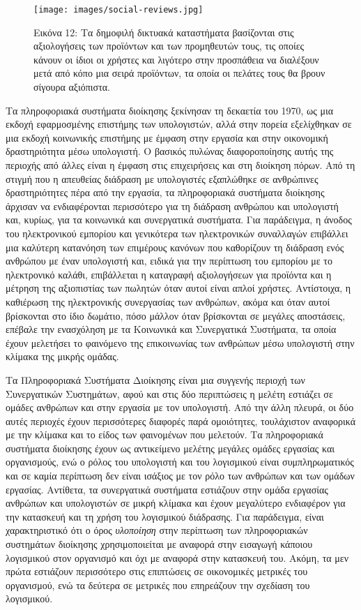 \documentclass[
]{article}
\begin{document}
\leavevmode{}%
\begin{figure}
\hypertarget{fig:social-reviews}{%
\centering
\texttt{[image: images/social-reviews.jpg]}
\caption{Εικόνα 12: Τα δημοφιλή δικτυακά καταστήματα βασίζονται στις
αξιολογήσεις των προϊόντων και των προμηθευτών τους, τις οποίες κάνουν
οι ίδιοι οι χρήστες και λιγότερο στην προσπάθεια να διαλέξουν μετά από
κόπο μια σειρά προϊόντων, τα οποία οι πελάτες τους θα βρουν σίγουρα
αξιόπιστα.}\label{fig:social-reviews}
}
\end{figure}

Τα πληροφοριακά συστήματα διοίκησης ξεκίνησαν τη δεκαετία του 1970, ως
μια εκδοχή εφαρμοσμένης επιστήμης των υπολογιστών, αλλά στην πορεία
εξελίχθηκαν σε μια εκδοχή κοινωνικής επιστήμης με έμφαση στην εργασία
και στην οικονομική δραστηριότητα μέσω υπολογιστή. Ο βασικός πυλώνας
διαφοροποίησης αυτής της περιοχής από άλλες είναι η έμφαση στις
επιχειρήσεις και στη διοίκηση πόρων. Από τη στιγμή που η απευθείας
διάδραση με υπολογιστές εξαπλώθηκε σε ανθρώπινες δραστηριότητες πέρα από
την εργασία, τα πληροφοριακά συστήματα διοίκησης άρχισαν να
ενδιαφέρονται περισσότερο για τη διάδραση ανθρώπου και υπολογιστή και,
κυρίως, για τα κοινωνικά και συνεργατικά συστήματα. Για παράδειγμα, η
άνοδος του ηλεκτρονικού εμπορίου και γενικότερα των ηλεκτρονικών
συναλλαγών επιβάλλει μια καλύτερη κατανόηση των επιμέρους κανόνων που
καθορίζουν τη διάδραση ενός ανθρώπου με έναν υπολογιστή και, ειδικά για
την περίπτωση του εμπορίου με το ηλεκτρονικό καλάθι, επιβάλλεται η
καταγραφή αξιολογήσεων για προϊόντα και η μέτρηση της αξιοπιστίας των
πωλητών όταν αυτοί είναι απλοί χρήστες. Αντίστοιχα, η καθιέρωση της
ηλεκτρονικής συνεργασίας των ανθρώπων, ακόμα και όταν αυτοί βρίσκονται
στο ίδιο δωμάτιο, πόσο μάλλον όταν βρίσκονται σε μεγάλες αποστάσεις,
επέβαλε την ενασχόληση με τα Κοινωνικά και Συνεργατικά Συστήματα, τα
οποία έχουν μελετήσει το φαινόμενο της επικοινωνίας των ανθρώπων μέσω
υπολογιστή στην κλίμακα της μικρής ομάδας.

Τα Πληροφοριακά Συστήματα Διοίκησης είναι μια συγγενής περιοχή των
Συνεργατικών Συστημάτων, αφού και στις δύο περιπτώσεις η μελέτη εστιάζει
σε ομάδες ανθρώπων και στην εργασία με τον υπολογιστή. Από την άλλη
πλευρά, οι δύο αυτές περιοχές έχουν περισσότερες διαφορές παρά
ομοιότητες, τουλάχιστον αναφορικά με την κλίμακα και το είδος των
φαινομένων που μελετούν. Τα πληροφοριακά συστήματα διοίκησης έχουν ως
αντικείμενο μελέτης μεγάλες ομάδες εργασίας και οργανισμούς, ενώ ο ρόλος
του υπολογιστή και του λογισμικού είναι συμπληρωματικός και σε καμία
περίπτωση δεν είναι ισάξιος με τον ρόλο των ανθρώπων και των ομάδων
εργασίας. Αντίθετα, τα συνεργατικά συστήματα εστιάζουν στην ομάδα
εργασίας ανθρώπων και υπολογιστών σε μικρή κλίμακα και έχουν μεγαλύτερο
ενδιαφέρον για την κατασκευή και τη χρήση του λογισμικού διάδρασης. Για
παράδειγμα, είναι χαρακτηριστικό ότι ο όρος \emph{υλοποίηση} στην
περίπτωση των πληροφοριακών συστημάτων διοίκησης χρησιμοποιείται με
αναφορά στην εισαγωγή κάποιου λογισμικού στον οργανισμό και όχι με
αναφορά στην κατασκευή του. Ακόμη, τα μεν πρώτα εστιάζουν περισσότερο
στις επιπτώσεις σε οικονομικές μετρικές του οργανισμού, ενώ τα δεύτερα
σε μετρικές που επηρεάζουν την σχεδίαση του λογισμικού.
\end{document}
